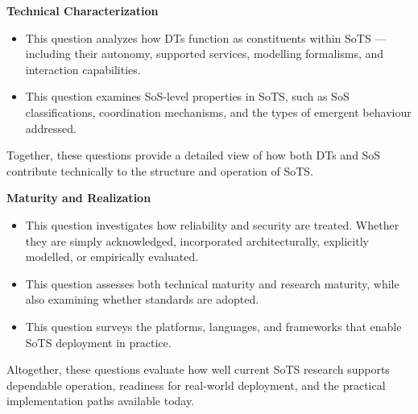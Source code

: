 \vspace{0.5em}
\noindent \textbf{\large Technical Characterization}
\vspace{-1em}
\begin{itemize}
    \item {} This question analyzes how DTs function as constituents within SoTS — including their autonomy, supported services, modelling formalisms, and interaction capabilities.
    \item {} This question examines SoS-level properties in SoTS, such as SoS classifications, coordination mechanisms, and the types of emergent behaviour addressed.
\end{itemize}
Together, these questions provide a detailed view of how both DTs and SoS contribute technically to the structure and operation of SoTS.

\vspace{0.5em}
\noindent \textbf{\large Maturity and Realization}
\vspace{-1em}
\begin{itemize}
    \item {}
    This question investigates how reliability and security are treated. Whether they are simply acknowledged, incorporated architecturally, explicitly modelled, or empirically evaluated.
    \item {} This question assesses both technical maturity and research maturity, while also examining whether standards are adopted.
    \item {}  
    This question surveys the platforms, languages, and frameworks that enable SoTS deployment in practice.
\end{itemize}
Altogether, these questions evaluate how well current SoTS research supports dependable operation, readiness for real-world deployment, and the practical implementation paths available today.
